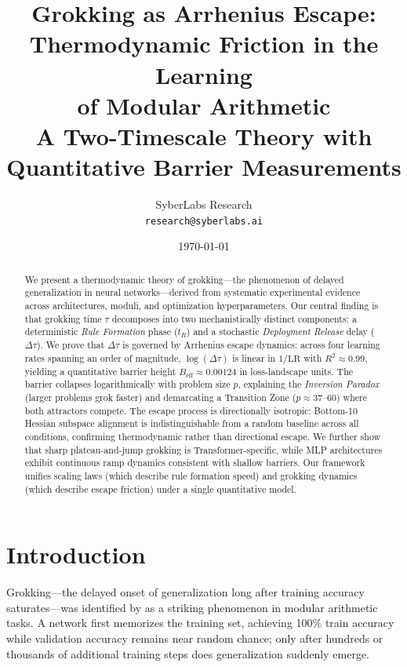 \documentclass[11pt,twocolumn]{article}
\title{\textbf{Grokking as Arrhenius Escape:\\
Thermodynamic Friction in the Learning\\
of Modular Arithmetic}\\[0.4em]
\large A Two-Timescale Theory with Quantitative Barrier Measurements}
\author{
  SyberLabs Research\\
  \texttt{research@syberlabs.ai}
}
\date{\today}
\begin{document}
\maketitle

\begin{abstract}
We present a thermodynamic theory of grokking---the phenomenon of delayed generalization in neural networks---derived from systematic experimental evidence across architectures, moduli, and optimization hyperparameters. Our central finding is that grokking time $\tau$ decomposes into two mechanistically distinct components: a deterministic \emph{Rule Formation} phase ($t_R$) and a stochastic \emph{Deployment Release} delay ($\Delta\tau$). We prove that $\Delta\tau$ is governed by Arrhenius escape dynamics: across four learning rates spanning an order of magnitude, $\log(\Delta\tau)$ is linear in $1/\mathrm{LR}$ with $R^2 \approx 0.99$, yielding a quantitative barrier height $B_\mathrm{eff} \approx 0.00124$ in loss-landscape units. The barrier collapses logarithmically with problem size $p$, explaining the \emph{Inversion Paradox} (larger problems grok faster) and demarcating a Transition Zone ($p \approx 37$--$60$) where both attractors compete. The escape process is directionally isotropic: Bottom-10 Hessian subspace alignment is indistinguishable from a random baseline across all conditions, confirming thermodynamic rather than directional escape. We further show that sharp plateau-and-jump grokking is Transformer-specific, while MLP architectures exhibit continuous ramp dynamics consistent with shallow barriers. Our framework unifies scaling laws (which describe rule formation speed) and grokking dynamics (which describe escape friction) under a single quantitative model.
\end{abstract}

\section{Introduction}

Grokking---the delayed onset of generalization long after training accuracy saturates---was identified by \citet{power2022grokking} as a striking phenomenon in modular arithmetic tasks. A network first memorizes the training set, achieving 100\% train accuracy while validation accuracy remains near random chance; only after hundreds or thousands of additional training steps does generalization suddenly emerge.
\end{document}
